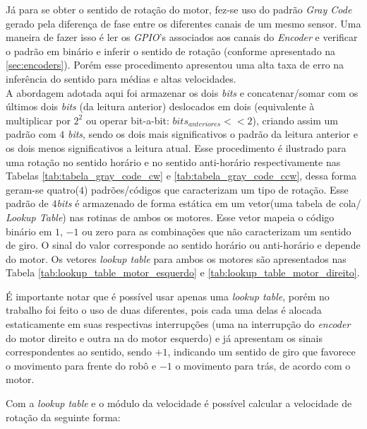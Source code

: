 Já para se obter o sentido de rotação do motor, fez-se uso do padrão \emph{Gray Code} gerado pela diferença de fase entre os diferentes canais de um mesmo sensor. Uma maneira de fazer isso é ler os \emph{GPIO}'s associados aos canais do \emph{Encoder} e verificar o padrão em binário e inferir o sentido de rotação (conforme apresentado na \autoref{sec:encoders}). Porém esse procedimento apresentou uma alta taxa de erro na inferência do sentido para médias e altas velocidades. \\

A abordagem adotada aqui foi armazenar os dois \emph{bits} e concatenar/somar com os últimos dois \emph{bits} (da leitura anterior) deslocados em dois (equivalente à multiplicar por $2^2$ ou operar bit-a-bit: $bits_{anteriores} << 2$), criando assim um padrão com $4$ \emph{bits}, sendo os dois mais significativos o padrão da leitura anterior e os dois menos significativos a leitura atual. Esse procedimento é ilustrado para uma rotação no sentido horário e no sentido anti-horário respectivamente nas Tabelas \ref{tab:tabela_gray_code_cw} e \ref{tab:tabela_gray_code_ccw}, dessa forma geram-se quatro($4$) padrões/códigos que caracterizam um tipo de rotação. Esse padrão de $4$\emph{bits} é armazenado de forma estática em um vetor(uma tabela de cola/ \emph{Lookup Table}) nas rotinas de ambos os motores. Esse vetor mapeia o código binário em $1$, $-1$ ou zero para as combinações que não caracterizam um sentido de giro. O sinal do valor corresponde ao sentido horário ou anti-horário e depende do motor. Os vetores \emph{lookup table} para ambos os motores são apresentados  nas Tabela \ref{tab:lookup_table_motor_esquerdo} e \ref{tab:lookup_table_motor_direito}. 






É importante notar que é possível usar apenas uma \emph{lookup table}, porém no trabalho foi feito o uso de duas diferentes, pois cada uma delas é alocada estaticamente em suas respectivas interrupções (uma na interrupção do \emph{encoder} do motor direito e outra na do motor esquerdo) e já apresentam os sinais correspondentes ao sentido, sendo $+1$, indicando um sentido de giro que favorece o movimento para frente do robô e $-1$ o movimento para trás, de acordo com o motor.

Com a \emph{lookup table} e o módulo da velocidade é possível calcular a velocidade de rotação da seguinte forma:


